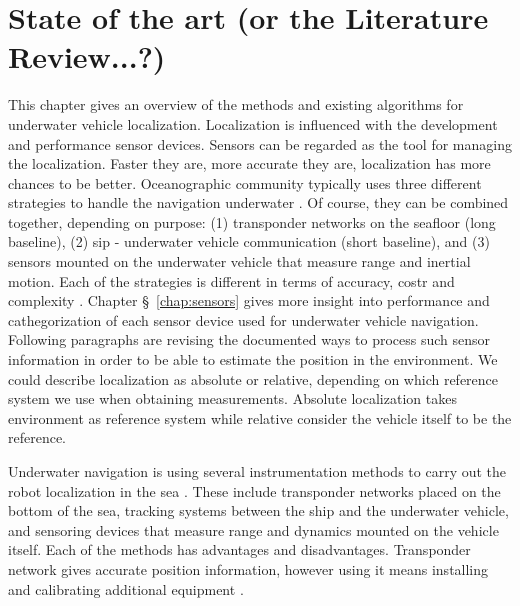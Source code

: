 \chapter{State of the art (or the Literature Review...?)} \label{chap:state-of-the-art}


This chapter gives an overview of the methods and existing algorithms for underwater vehicle localization. Localization is influenced with the development and performance sensor devices. Sensors can be regarded as the tool for managing the localization. Faster they are, more accurate they are, localization has more chances to be better. Oceanographic community typically uses three different strategies to handle the navigation underwater \cite{whitcomb99}. Of course, they can be combined together, depending on purpose: (1) transponder networks on the seafloor (long baseline), (2) sip - underwater vehicle communication (short baseline), and (3) sensors mounted on the underwater vehicle that measure range and inertial motion. Each of the strategies is different in terms of accuracy, costr and complexity \cite{eustice05}. Chapter \S~\ref{chap:sensors} gives more insight into performance and cathegorization of each sensor device used for underwater vehicle navigation. Following paragraphs are revising the documented ways to process such sensor information in order to be able to estimate the position in the environment. We could describe localization as absolute or relative, depending on which reference system we use when obtaining measurements. Absolute localization takes environment as reference system while relative consider the vehicle itself to be the reference. 

Underwater navigation is using several instrumentation methods to carry out the robot localization in the sea \cite{whitcomb99}. These include transponder networks placed on the bottom of the sea, tracking systems between the ship and the underwater vehicle, and sensoring devices that measure range and dynamics mounted on the vehicle itself. Each of the methods has advantages and disadvantages. Transponder network gives accurate position information, however using it means installing and calibrating additional equipment \cite{eustice05}. 

